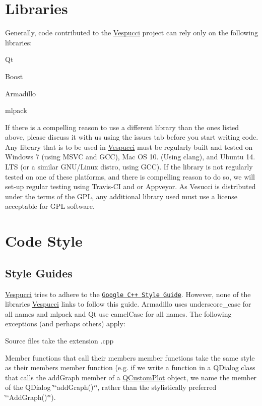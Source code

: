 \section*{Libraries }

Generally, code contributed to the \hyperlink{namespace_vespucci}{Vespucci} project can rely only on the following libraries\+:
\begin{DoxyItemize}
\item Qt
\item Boost
\item Armadillo
\item mlpack
\end{DoxyItemize}

If there is a compelling reason to use a different library than the ones listed above, please discuss it with us using the issues tab before you start writing code. Any library that is to be used in \hyperlink{namespace_vespucci}{Vespucci} must be regularly built and tested on Windows 7 (using M\+S\+VC and G\+CC), Mac OS 10. (Using clang), and Ubuntu 14. L\+TS (or a similar G\+N\+U/\+Linux distro, using G\+CC). If the library is not regularly tested on one of these platforms, and there is compelling reason to do so, we will set-\/up regular testing using Travis-\/\+CI and or Appveyor. As Vesucci is distributed under the terms of the G\+PL, any additional library used must use a license acceptable for G\+PL software.

\section*{Code Style }

\subsection*{Style Guides }

\hyperlink{namespace_vespucci}{Vespucci} tries to adhere to the \href{https://google.github.io/styleguide/cppguide.html}{\tt Google C++ Style Guide}. However, none of the libraries \hyperlink{namespace_vespucci}{Vespucci} links to follow this guide. Armadillo uses underscore\+\_\+case for all names and mlpack and Qt use camel\+Case for all names. The following exceptions (and perhaps others) apply\+:
\begin{DoxyItemize}
\item Source files take the extension {\ttfamily .cpp}
\item Member functions that call their member\textquotesingle{}s member functions take the same style as their member\textquotesingle{}s member function (e.\+g. if we write a function in a {\ttfamily Q\+Dialog} class that calls the {\ttfamily add\+Graph} member of a {\ttfamily \hyperlink{class_q_custom_plot}{Q\+Custom\+Plot}} object, we name the member of the {\ttfamily Q\+Dialog} \char`\"{}`add\+Graph()`\char`\"{}, rather than the stylistically preferred \char`\"{}`\+Add\+Graph()`\char`\"{}).
\end{DoxyItemize}

